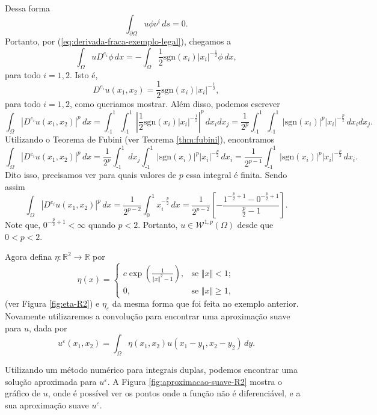 \documentclass[a4paper, 11pt]{book}
\theoremstyle{definition}
\newcommand{\bR}{\mathbb{R}}
\newcommand{\cW}{\mathcal{W}}
\newcommand{\sgn}{\mathrm{sgn}}
\begin{document}
\begin{ex}
    Dessa forma
    \[
        \int_{\partial\Omega} u \phi \nu^i \,ds = 0.
    \]
    Portanto, por (\ref{eq:derivada-fraca-exemplo-legal}), chegamos a
    \[
        \int_\Omega  u D^{e_i} \phi \,dx = - \int_\Omega \frac{1}{2}\sgn(x_i) |x_i|^{-\frac{1}{2}} \phi \,dx,
    \]
    para todo $i=1,2$.
    Isto é,
    \[
        D^{e_i} u(x_1,x_2) = \frac{1}{2}\sgn(x_i) |x_i|^{-\frac{1}{2}},
    \]
    para todo $i = 1,2$, como queriamos mostrar.
    Além disso, podemos escrever
    \[
        \int_\Omega |D^{e_i} u (x_1,x_2)|^p \, dx = \int_{\text{-}1}^1 \int_{\text{-}1}^1 \left| \frac{1}{2} \sgn(x_i) |x_i|^{-\frac{1}{2}} \right|^p \, dx_i dx_j = \frac{1}{2^p}\int_{\text{-}1}^1 \int_{\text{-}1}^1 |\sgn(x_i)|^p |x_i|^{-\frac{p}{2}} \,dx_i dx_j.
    \]
    Utilizando o Teorema de Fubini (ver Teorema \ref{thm:fubini}), encontramos
    {\small
    \[
        \int_\Omega |D^{e_i} u (x_1,x_2)|^p \, dx = \frac{1}{2^p}\int_{\text{-}1}^1 dx_j \int_{\text{-}1}^1 |\sgn(x_i)|^p |x_i|^{-\frac{p}{2}} \,dx_i = \frac{1}{2^{p-1}} \int_{\text{-}1}^1 |\sgn(x_i)|^p |x_i|^{-\frac{p}{2}} \,dx_i.
    \]}\!
    Dito isso, precisamos ver para quais valores de $p$ essa integral é finita. Sendo assim
    \[
        \int_\Omega |D^{e_i} u (x_1,x_2)|^p \, dx = \frac{1}{2^{p-2}}\int_0^1 x_i^{-\frac{p}{2}} \,dx = \frac{1}{2^{p-2}} \left[ -\frac{1^{-\frac{p}{2}+1} - 0^{-\frac{p}{2}+1}}{\tfrac{p}{2} - 1} \right].
    \]
    Note que,
    $0^{-\frac{p}{2} + 1} < \infty$ quando $p < 2$. Portanto, $u \in \cW^{1,p}(\Omega)$ desde que $0 < p < 2$.

    Agora defina $\eta: \bR^2 \to \bR$ por
    \[
        \eta(x) = 
        \left\{ 
            \begin{array}{lr}
                c \exp\left(\frac{1}{\Vert x \Vert^2 - 1} \right), & \text{se } \Vert x \Vert < 1;\\
                0, & \text{se } \Vert x \Vert \geqslant 1,
            \end{array}
        \right.
    \]
    (ver Figura \ref{fig:eta-R2}) e $\eta_\varepsilon$ da mesma forma que foi feita no exemplo anterior. Novamente utilizaremos a convolução para encontrar uma aproximação suave para $u$, dada por
    \[
        u^{\varepsilon}(x_1,x_2) = \int_\Omega \eta(x_1,x_2) u(x_1 - y_1, x_2 - y_2) \,dy.
    \]

    Utilizando um método numérico para integrais duplas, podemos encontrar uma solução aproximada para $u^\varepsilon$.
    A Figura \ref{fig:aproximacao-suave-R2} mostra o gráfico de $u$, onde é possível ver os pontos onde a função não é diferenciável, e a sua aproximação suave $u^\varepsilon$.


\end{ex}
\end{document}
